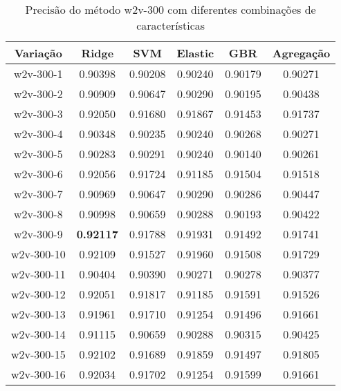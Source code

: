 \begin{table}[H]
\label{tab:precisionw2v300}
\centering
\begin{tabular}{|c| c c  c  c  c| }
\hline
Variação &  Ridge & SVM & Elastic & GBR & Agregação  \\ 
\hline
w2v-300-1 & 0.90398 & 0.90208 & 0.90240 & 0.90179 & 0.90271 \\
\hline
w2v-300-2 & 0.90909 & 0.90647 & 0.90290 & 0.90195 & 0.90438 \\
\hline
w2v-300-3 & 0.92050 & 0.91680 & 0.91867 & 0.91453 & 0.91737 \\
\hline
w2v-300-4 & 0.90348 & 0.90235 & 0.90240 & 0.90268 & 0.90271 \\
\hline
w2v-300-5 & 0.90283 & 0.90291 & 0.90240 & 0.90140 & 0.90261 \\
\hline
w2v-300-6 & 0.92056 & 0.91724 & 0.91185 & 0.91504 & 0.91518 \\
\hline
w2v-300-7 & 0.90969 & 0.90647 & 0.90290 & 0.90286 & 0.90447 \\
\hline
w2v-300-8 & 0.90998 & 0.90659 & 0.90288 & 0.90193 & 0.90422 \\
\hline
w2v-300-9 & \textbf{0.92117} & 0.91788 & 0.91931 & 0.91492 & 0.91741 \\
\hline
w2v-300-10 & 0.92109 & 0.91527 & 0.91960 & 0.91508 & 0.91729 \\
\hline
w2v-300-11 & 0.90404 & 0.90390 & 0.90271 & 0.90278 & 0.90377 \\
\hline
w2v-300-12 & 0.92051 & 0.91817 & 0.91185 & 0.91591 & 0.91526 \\
\hline
w2v-300-13 & 0.91961 & 0.91710 & 0.91254 & 0.91496 & 0.91661 \\
\hline
w2v-300-14 & 0.91115 & 0.90659 & 0.90288 & 0.90315 & 0.90425 \\
\hline
w2v-300-15 & 0.92102 & 0.91689 & 0.91859 & 0.91497 & 0.91805 \\
\hline
w2v-300-16 & 0.92034 & 0.91702 & 0.91254 & 0.91599 & 0.91661 \\
\hline
\end{tabular}
\caption{Precisão do método w2v-300 com diferentes combinações de características}
\end{table}

